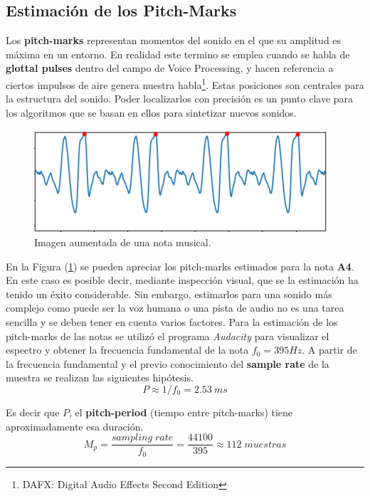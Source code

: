 \subsection{Estimación de los Pitch-Marks}
Los \textbf{pitch-marks} representan momentos del sonido en el que su amplitud es máxima en un entorno. En realidad este termino se emplea cuando se habla de \textbf{glottal pulses} dentro del campo de Voice Processing, y hacen referencia a ciertos impulsos de aire genera nuestra habla\footnote{DAFX: Digital Audio Effects Second Edition}.
Estas posiciones son centrales para la estructura del sonido. Poder localizarlos con precisión es un punto clave para los algoritmos que se basan en ellos para sintetizar nuevos sonidos.
\begin{figure}[H]
	\centering
	\includegraphics[width=0.7\linewidth]{ImagenesEjercicio5/soundZoomPMS.PNG}
	\caption{Imagen aumentada de una nota musical.}
	\label{fig:soundzoom}
\end{figure}

En la Figura (\ref{fig:soundzoom}) se pueden apreciar los pitch-marks estimados para la nota \textbf{A4}. En este caso es posible decir, mediante inspección visual, que se la estimación ha tenido un éxito considerable. Sin embargo, estimarlos para una sonido más complejo como puede ser la voz humana o una pista de audio no es una tarea sencilla y se deben tener en cuenta varios factores.
Para la estimación de los pitch-marks de las notas se utilizó el programa \textit{Audacity} para visualizar el espectro y obtener la frecuencia fundamental de la nota $f_0 = 395Hz$. A partir de la frecuencia fundamental y el previo conocimiento del \textbf{sample rate} de la muestra se realizan las siguientes hipótesis.
\begin{equation*}
	P \approx 1/f_0 = 2.53 \ ms
\end{equation*}	
	
Es decir que $P$, el \textbf{pitch-period} (tiempo entre pitch-marks) tiene aproximadamente esa duración. 
\begin{equation*}
	M_p = \frac{sampling\;rate}{f_0} = \frac{44100}{395} \approx 112\; muestras
\end{equation*}	

